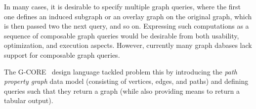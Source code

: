 
In many cases, it is desirable to specify multiple graph queries, where the
first one defines an induced subgraph or an overlay graph on the original graph,
which is then passed two the next query, and so on. Expressing such computations
as a sequence of composable graph queries would be desirable from both
usability, optimization, and execution aspects. However, currently many graph
dabases lack support for composable graph queries.

The \mbox{G-CORE}~\cite{DBLP:conf/sigmod/AnglesABBFGLPPS18} design language
tackled problem this by introducing the \emph{path property graph} data model
(consisting of vertices, edges, and paths) and defining queries such that they
return a graph (while also providing means to return a tabular output).


